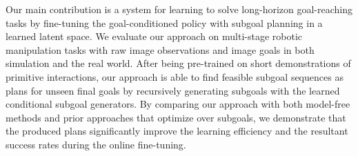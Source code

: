 Our main contribution is a system for learning to solve long-horizon goal-reaching tasks by fine-tuning the goal-conditioned policy with subgoal planning in a learned latent space. 
We evaluate our approach on multi-stage robotic manipulation tasks with raw image observations and image goals in both simulation and the real world.
After being pre-trained on short demonstrations of primitive interactions, our approach is able to find feasible subgoal sequences as plans for unseen final goals by recursively generating subgoals with the learned conditional subgoal generators. By comparing our approach with both model-free methods and prior approaches that optimize over subgoals, we demonstrate that the produced plans significantly improve the learning efficiency and the resultant success rates during the online fine-tuning.





